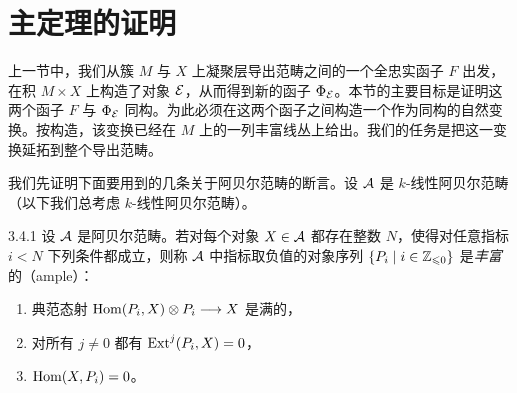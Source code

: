 \section{主定理的证明}

上一节中，我们从簇 $M$ 与 $X$ 上凝聚层导出范畴之间的一个全忠实函子 $F$ 出发，在积 $M\times X$ 上构造了对象 $\mathcal{E}$，从而得到新的函子 $\Phi_{\mathcal{E}}$。本节的主要目标是证明这两个函子 $F$ 与 $\Phi_{\mathcal{E}}$ 同构。为此必须在这两个函子之间构造一个作为同构的自然变换。按构造，该变换已经在 $M$ 上的一列丰富线丛上给出。我们的任务是把这一变换延拓到整个导出范畴。

我们先证明下面要用到的几条关于阿贝尔范畴的断言。设 $\mathcal{A}$ 是 $k$-线性阿贝尔范畴（以下我们总考虑 $k$-线性阿贝尔范畴）。

\begin{definition}{3.4.1}
设 $\mathcal{A}$ 是阿贝尔范畴。若对每个对象 $X\in\mathcal{A}$ 都存在整数 $N$，使得对任意指标 $i<N$ 下列条件都成立，则称 $\mathcal{A}$ 中指标取负值的对象序列 $\{P_i\mid i\in\mathbb{Z}_{\leqslant 0}\}$ 是\emph{丰富}的（ample）：
\begin{enumerate}[label=\alph*),leftmargin=2.4em,itemsep=1pt,topsep=2pt]
\item 典范态射 $\operatorname{Hom}(P_i,X)\otimes P_i\longrightarrow X$ 是满的，
\item 对所有 $j\neq 0$ 都有 $\operatorname{Ext}^{j}(P_i,X)=0$，
\item $\operatorname{Hom}(X,P_i)=0$。
\end{enumerate}
\end{definition}

